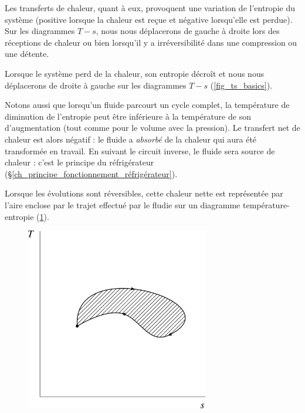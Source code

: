 		Les transferts de chaleur, quant à eux, provoquent une variation de l’entropie du système (positive lorsque la chaleur est reçue et négative lorsqu’elle est perdue). Sur les diagrammes $T-s$, nous nous déplacerons de gauche à droite lors des réceptions de chaleur ou bien lorsqu’il y a irréversibilité dans une compression ou une détente.

		Lorsque le système perd de la chaleur, son entropie décroît et nous nous déplacerons de droite à gauche sur les diagrammes $T-s$ (\cref{fig_ts_basics}).

		\clearfloats
		Notons aussi que lorsqu’un fluide parcourt un cycle complet, la température de diminution de l'entropie peut être inférieure à la température de son d'augmentation (tout comme pour le volume avec la pression). Le transfert net de chaleur est alors négatif : le fluide a \emph{absorbé} de la chaleur qui aura été transformée en travail. En suivant le circuit inverse, le fluide sera source de chaleur : c’est le principe du réfrigérateur (\S\ref{ch_principe_fonctionnement_réfrigérateur}).
		
		Lorsque les évolutions sont réversibles, cette chaleur nette est représentée par l’aire enclose par le trajet effectué par le fludie sur un diagramme température-entropie (\cref{fig_ts_cycle}).

		\begin{figure}
			\begin{center}
				\includegraphics[width=8cm]{images/ts_cycle.png}
			\end{center}
			\label{fig_ts_cycle}
		\end{figure}

